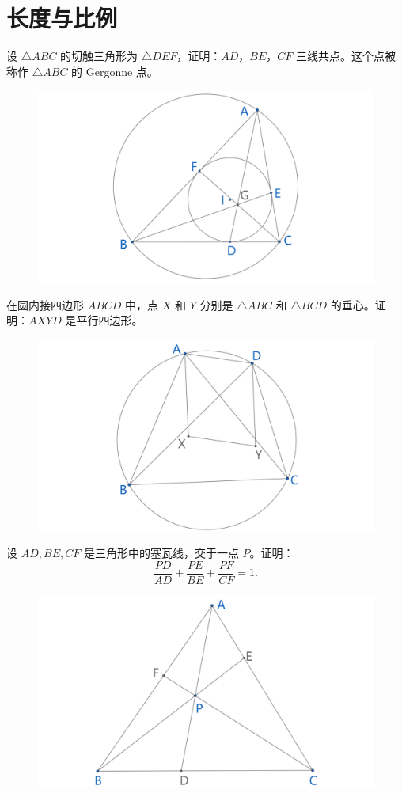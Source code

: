 \section{长度与比例}

\begin{exercise}
设 $\triangle ABC$ 的切触三角形为 $\triangle DEF$，证明：${AD}$，${BE}$，${CF}$ 三线共点。这个点被称作 $\triangle ABC$ 的 Gergonne 点。
\end{exercise}
\begin{figure}[H]
    \centering
    \includegraphics[width=0.7\linewidth]{figures/exercises/316.png}
\end{figure}


\begin{exercise}
在圆内接四边形 $ABCD$ 中，点 $X$ 和 $Y$ 分别是 $\triangle ABC$ 和 $\triangle BCD$ 的垂心。证明：$AXYD$ 是平行四边形。
\end{exercise}
\begin{figure}[H]
    \centering
    \includegraphics[width=0.7\linewidth]{figures/exercises/317.png}
\end{figure}


\newpage 
\begin{exercise}
    设 $AD, BE, CF$ 是三角形中的塞瓦线，交于一点 $P$。证明：
    $$
    \frac{PD}{AD} + \frac{PE}{BE} + \frac{PF}{CF} = 1.
    $$
\end{exercise}
\begin{figure}[H]
    \centering
    \includegraphics[width=0.7\linewidth]{figures/exercises/318.png}
\end{figure}

